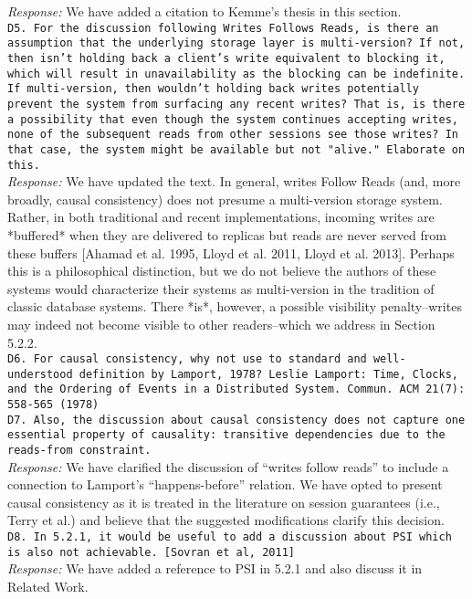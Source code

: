 \documentclass[10pt]{article}
\newcommand{\reviewer}[1] {\noindent\texttt{#1}\\}
\newcommand{\response}[1] {\noindent\textit{Response: } #1\\}
\begin{document}
\response{We have added a citation to Kemme's thesis in this section.}

\reviewer{D5. For the discussion following Writes Follows Reads, is there an assumption that the underlying storage layer is multi-version? If not, then isn't holding back a client's write equivalent to blocking it, which will result in unavailability as the blocking can be indefinite. If multi-version, then wouldn't holding back writes potentially prevent the system from surfacing any recent writes? That is, is there a possibility that even though the system continues accepting writes, none of the subsequent reads from other sessions see those writes? In that case, the system might be available but not "alive." Elaborate on this.}

\response{We have updated the text. In general, writes Follow Reads
  (and, more broadly, causal consistency) does not presume a
  multi-version storage system. Rather, in both traditional and recent
  implementations, incoming writes are *buffered* when they are
  delivered to replicas but reads are never served from these buffers
  [Ahamad et al. 1995, Lloyd et al. 2011, Lloyd et al. 2013]. Perhaps
  this is a philosophical distinction, but we do not believe the
  authors of these systems would characterize their systems as
  multi-version in the tradition of classic database systems. There
  *is*, however, a possible visibility penalty--writes may indeed not
  become visible to other readers--which we address in
  Section 5.2.2.}

\reviewer{D6. For causal consistency, why not use to standard and well-understood definition by Lamport, 1978? Leslie Lamport: Time, Clocks, and the Ordering of Events in a Distributed System. Commun. ACM 21(7): 558-565 (1978)\\
D7. Also, the discussion about causal consistency does not capture one essential property of causality: transitive dependencies due to the reads-from constraint.}

\response{We have clarified the discussion of ``writes follow reads''
  to include a connection to Lamport's ``happens-before'' relation. We
  have opted to present causal consistency as it is treated in the
  literature on session guarantees (i.e., Terry et al.) and believe
  that the suggested modifications clarify this decision.}

\reviewer{D8. In 5.2.1, it would be useful to add a discussion about PSI which is also not achievable. [Sovran et al, 2011]}

\response{We have added a reference to PSI in 5.2.1 and also discuss it in Related Work.}
\end{document}
